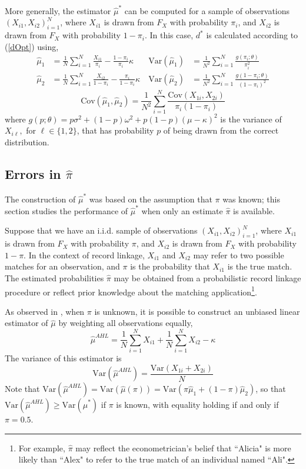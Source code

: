 \documentclass[12pt]{article}
\newcommand{\Var}[1]{\text{Var}\left(#1\right)}
\begin{document}
More generally, the estimator $\hat{\mu}^*$ can be computed for a sample of observations $(X_{i1}, X_{i2})_{i=1}^N$, where $X_{i1}$ is drawn from $F_X$ with probability $\pi_i$, and $X_{i2}$ is drawn from $F_X$ with probability $1-\pi_i$.  In this case, $d^*$ is calculated according to (\ref{dOpt}) using,
\begin{align*} \hat{\mu}_1 &= \frac{1}{N} \sum_{i=1}^N \frac{X_{i1}}{\pi_i} - \frac{1-\pi_i}{\pi_i}\kappa 
& \Var{\hat{\mu}_1} &=  \frac{1}{N^2}\sum_{i=1}^N \frac{g(\pi_i; \theta)}{\pi_i^2} \\
 \hat{\mu}_2 &= \frac{1}{N} \sum_{i=1}^N \frac{X_{i2}}{1-\pi_i} - \frac{\pi_i}{1-\pi_i}\kappa \ &\Var{\hat{\mu}_2} &= \frac{1}{N^2} \sum_{i=1}^N \frac{g(1-\pi_i; \theta)}{(1-\pi_i)^2} \end{align*}
$$\text{Cov}(\hat{\mu}_1, \hat{\mu}_2) = \frac{1}{N^2}\sum_{i=1}^N \frac{\text{Cov}(X_{1i}, X_{2i})}{\pi_i(1-\pi_i)} $$
where $g(p; \theta) = p \sigma^2 + (1-p) \omega^2 + p(1-p)(\mu-\kappa)^2$ is the variance of $X_{i\ell},$ for $\ell \in \{1,2\}$, that has probability $p$ of being drawn from the correct distribution.  


\subsection{Errors in $\hat{\pi}$}

The construction of $\hat{\mu}^*$ was based on the assumption that $\pi$ was known; this section studies the performance of $\hat{\mu}^*$ when only an estimate $\hat{\pi}$ is available. 

Suppose that we have an i.i.d. sample of observations $(X_{i1}, X_{i2})_{i=1}^N$, where $X_{i1}$ is drawn from $F_X$ with probability $\pi$, and $X_{i2}$ is drawn from $F_X$ with probability $1-\pi$.  In the context of record linkage, $X_{i1}$ and $X_{i2}$ may refer to two possible matches for an observation, and $\pi$ is the probability that $X_{i1}$ is the true match.  The estimated probabilities $\hat{\pi}$ may be obtained from a probabilistic record linkage procedure or reflect prior knowledge about the matching application\footnote{For example, $\hat{\pi}$ may reflect the econometrician's belief that ``Alicia" is more likely than ``Alex" to refer to the true match of an individual named ``Ali".}.

As observed in \citet*{ahl2019}, when $\pi$ is unknown, it is possible to construct an unbiased linear estimator of $\hat{\mu}$ by weighting all observations equally,
\begin{equation} \hat{\mu}^{AHL} =  \frac{1}{N}\sum_{i=1}^N X_{i1} + \frac{1}{N} \sum_{i=1}^N X_{i2} - \kappa \label{ahl}\end{equation}
The variance of this estimator is
\begin{equation}
\Var{\hat{\mu}^{AHL}} = \frac{\Var{X_{1i} + X_{2i}}}{N} 
\label{var_ahl}
\end{equation}
Note that $\Var{\hat{\mu}^{AHL}} = \Var{\hat{\mu}(\pi)} = \Var{\pi \hat{\mu}_1 + (1-\pi)\hat{\mu}_2}$, so that  $\Var{\hat{\mu}^{AHL}} \geq \Var{\hat{\mu}^*}$ if $\pi$ is known, with equality holding if and only if $\pi = 0.5$.  
\end{document}
